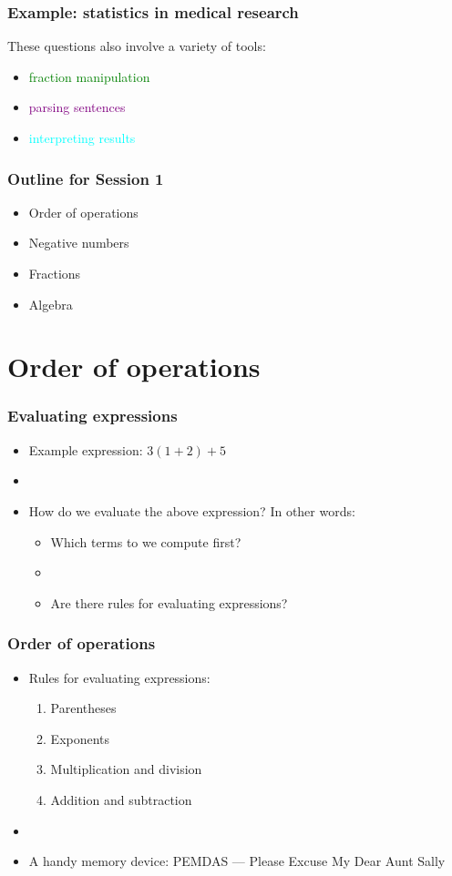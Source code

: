 \documentclass[11pt]{beamer}
\newcommand{\myframe}[1]{\begin{frame} \frametitle{#1}}
\newenvironment{spaceitemize}
{ \begin{itemize}
    \setlength{\itemsep}{10pt}
    \setlength{\parskip}{0pt}
    \setlength{\parsep}{0pt}     }
{ \end{itemize}                  }
\begin{document}
\myframe{Example: statistics in medical research}
These questions also involve a variety of tools:
\begin{spaceitemize}
\item \textcolor{green}{fraction manipulation}
\item \textcolor{purple}{parsing sentences}
\item \textcolor{cyan}{interpreting results}
\end{spaceitemize}
\end{frame}

\myframe{Outline for Session 1}
\begin{spaceitemize}
\item Order of operations
\item Negative numbers 
\item Fractions
\item Algebra
\end{spaceitemize}
\end{frame}

\section{Order of operations}
\myframe{Evaluating expressions}
\begin{itemize}
\item Example expression: $3(1 + 2) + 5$
\item[]
\item How do we evaluate the above expression? In other words:
\begin{itemize}
\item Which terms to we compute first?
\item[]
\item Are there rules for evaluating expressions?
\end{itemize}
\end{itemize}
\end{frame}

\myframe{Order of operations}
\begin{itemize}
\item Rules for evaluating expressions:
\begin{enumerate}
\item Parentheses
\item Exponents
\item Multiplication and division
\item Addition and subtraction
\end{enumerate}
\item[]
\item A handy memory device: PEMDAS --- Please Excuse My Dear Aunt Sally
\end{itemize}
\end{frame}
\end{document}
